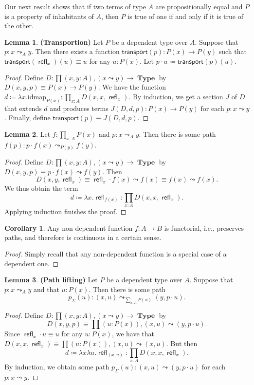 \documentclass[10pt,letterpaper,cm]{nupset}
\theoremstyle{definition}
\newtheorem{corollary}{Corollary}
\newtheorem{lemma}{Lemma}
\newcommand{\1}{\mathbf{1}}
\newcommand{\0}{\vec 0}
\DeclareMathOperator{\refl}{\mathsf{refl}}
\DeclareMathOperator{\type}{\mathbf{Type}}
\begin{document}
Our next result shows that if two terms of type $A$ are propositionally equal and $P$ is a property of inhabitants of $A$, then $P$ is true of one if and only if it is true of the other.

\begin{lemma}{\textbf{(Transportion)}}
Let $P$ be a dependent type over $A$. Suppose that $p: x\leadsto_A y$. Then there exists a function $\mathsf{transport}(p) : P(x) \to P(y)$ such that $\mathsf{transport}(\refl_x)(u) \equiv u$ for any $u: P(x)$. Let $p \cdot u \coloneqq \mathsf{transport}(p)(u)$.
\end{lemma}
\begin{proof}
Define $D: \prod (x,y:A), (x\leadsto y) \to \type$ by  $D(x,y,p) \equiv P(x) \to P(y)$. We have the function $d\coloneqq \lambda x.\text{idmap}_{P(x)} :\prod_{x:A}D(x,x,\refl_x)$. By induction, we get a section $J$ of $D$ that extends $d$ and produces terms $J(D,d,p) :P(x) \to P(y)$ for each $p: x\leadsto y$. Finally, define $\mathsf{transport}(p) \equiv J(D,d,p)$.
\end{proof}

\begin{lemma}
Let $f: \prod_{x:A}P(x)$ and $p: x\leadsto_A y$. Then there is some path $f(p):p \cdot f(x) \leadsto_{P(y)} f(y)$.
\end{lemma}
\begin{proof}
Define $D: \prod (x,y:A), (x\leadsto y) \to \type$ by  $D(x,y,p) \equiv p\cdot f(x) \leadsto f(y)$. Then $$D(x,y,\refl_x) \equiv \refl_x \cdot f(x) \leadsto f(x) \equiv f(x) \leadsto f(x).$$ We thus obtain the term $$ d\coloneqq \lambda x.\refl_{f(x)}: \prod_{x:A}D(x,x,\refl_x).$$ Applying induction finishes the proof.
\end{proof}

\begin{corollary}
Any non-dependent function $f: A \to B$ is functorial, i.e., preserves paths, and therefore is continuous in a certain sense.
\end{corollary}
\begin{proof}
Simply recall that any non-dependent function is a special case of a dependent one.
\end{proof}



\begin{lemma}{\textbf{(Path lifting)}}
Let $P$ be a dependent type over $A$. Suppose that $p: x\leadsto_A y$ and that $u: P(x)$. Then there is some path $$p_{\Sigma}(u) : (x, u) \leadsto_{\sum_{x:A}P(x)} (y, p\cdot u).$$
\end{lemma}
\begin{proof}
Define $D: \prod (x,y:A), (x\leadsto y) \to \type$ by  $$D(x,y,p) \equiv \prod(u:P(x)), (x,u) \leadsto (y, p\cdot u).$$ Since $\refl_x \cdot u \equiv u$ for any $u: P(x)$, we have that $D(x, x, \refl_x) \equiv \prod (u:P(x)), (x,u) \leadsto (x,u)$. But then $$ d\coloneqq\lambda x\lambda u. \refl_{(x,u)} : \prod_{x:A} D(x,x, \refl_x) .$$ By induction, we obtain some path $p_{\Sigma}(u) : (x,u)\leadsto (y, p \cdot u)$ for each $p: x\leadsto y$.
\end{proof}
\end{document}
